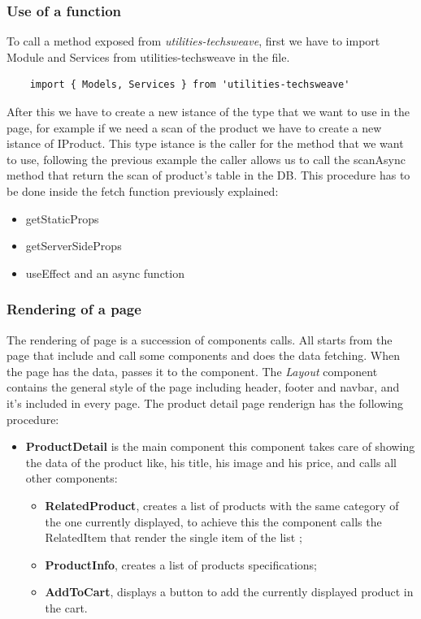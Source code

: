 \subsubsection{Use of a function}
To call a method exposed from \textit{utilities-techsweave}, first we have to import Module and Services from utilities-techsweave in the file.
\begin{lstlisting}
    import { Models, Services } from 'utilities-techsweave'
\end{lstlisting}
After this we have to create a new istance of the type that we want to use in the page, for example if we need a scan of the product we have to create a new istance of {\selectfont IProduct}. This type istance is the caller for the method that we want to use, following the previous example the caller allows us to call the {\selectfont scanAsync} method that return the scan of product's table in the DB. This procedure has to be done inside the fetch function previously explained:
\begin{itemize}
  \item {\selectfont getStaticProps}
  \item {\selectfont getServerSideProps}
  \item {\selectfont useEffect and an async function}
\end{itemize}
\subsubsection{Rendering of a page}
The rendering of page  is a succession of components calls. All starts from the page that include and call some components and does the data fetching. When the page has the data, passes it to the component. The \textit{Layout} component contains the general style of the page including header, footer and navbar, and it's included in every page. The product detail page renderign has the following procedure:
\begin{itemize}
  \item \textbf{ProductDetail} is the main component this component takes care of showing the data of the product like, his title, his image and his price, and calls all other components:
        \begin{itemize}
          \item \textbf{RelatedProduct}, creates a list of products with the same category of the one currently displayed, to achieve this the component calls the RelatedItem that render the single item of the list ;
          \item \textbf{ProductInfo}, creates a list of products specifications;
          \item \textbf{AddToCart}, displays a button to add the currently displayed product in the cart.
        \end{itemize}
\end{itemize}

